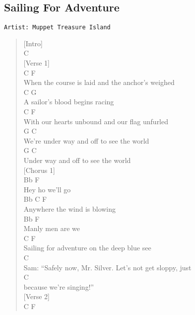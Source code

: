 \documentclass[11pt]{article}
\begin{document}
\subsection{Sailing For Adventure}
\label{sec:orgf6f1386}
\begin{verbatim}
Artist: Muppet Treasure Island
\end{verbatim}
\begin{verse}
[Intro]\\
C\\
\vspace*{1em}
[Verse 1]\\
\hspace*{9em}C                      F\\
When the course is laid and the anchor's weighed\\
\hspace*{2em}C                     G\\
A sailor's blood begins racing\\
\hspace*{9em}C                      F\\
With our hearts unbound and our flag unfurled\\
\hspace*{6em}G                    C\\
We're under way and off to see the world\\
G                    C\\
Under way and off to see the world\\
\vspace*{1em}
[Chorus 1]\\
Bb     F\\
Hey ho we'll go\\
Bb C         F\\
Anywhere the wind is blowing\\
Bb    F\\
Manly men are we\\
C                            F\\
Sailing for adventure on the deep blue see\\
\vspace*{1em}
C\\
Sam: ``Safely now, Mr. Silver. Let's not get sloppy, just\\
C\\
because we're singing!''\\
\vspace*{1em}
[Verse 2]\\
\hspace*{7em}C                     F\\

\end{verse}
\end{document}
